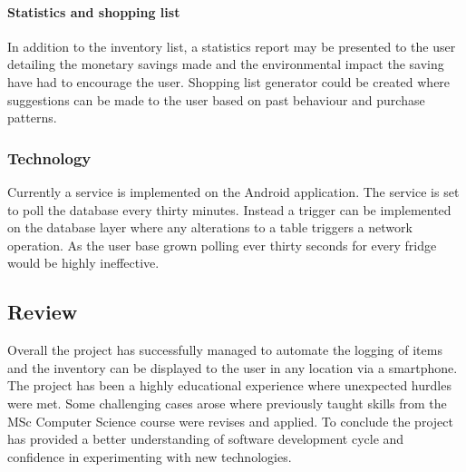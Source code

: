 \documentclass[a4paper, 11pt]{article}
\begin{document}
\paragraph{Statistics and shopping list}
In addition to the inventory list, a statistics report may be presented to the user detailing the monetary savings made and the environmental impact the saving have had to encourage the user. Shopping list generator could be created where suggestions can be made to the user based on past behaviour and purchase patterns. 

\subsubsection{Technology}
Currently a service is implemented on the Android application. The service is set to poll the database every thirty minutes. Instead a trigger can be implemented on the database layer where any alterations to a table triggers a network operation. As the user base grown polling ever thirty seconds for every fridge would be highly ineffective. 

\subsection{Review}
Overall the project has successfully managed to automate the logging of items and the inventory can be displayed to the user in any location via a smartphone. The project has been a highly educational experience where unexpected hurdles were met. Some challenging cases arose where previously taught skills from the MSc Computer Science course were revises and applied. To conclude the project has provided a better understanding of software development cycle and confidence in experimenting with new technologies.    

\vspace{\baselineskip}
\vspace{\baselineskip}
\vspace{\baselineskip}


\clearpage

\end{document}
